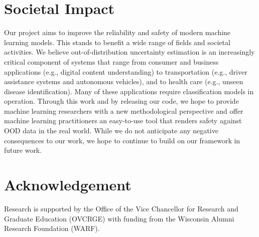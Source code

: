\documentclass{article}
\begin{document}
\vspace{-0.2cm}
\section{Societal Impact}
\label{sec:broad}
\vspace{-0.3cm}
Our project aims to improve the reliability and safety of modern machine learning models.
This stands to benefit a wide range of fields and societal activities. We believe out-of-distribution uncertainty estimation is an increasingly critical component of systems that range from consumer and business applications (e.g., digital content understanding) to transportation (e.g., driver assistance systems and autonomous vehicles), and to health care (e.g., unseen disease identification). Many of these applications require classification models in operation.\@
Through this work and by releasing our code, we hope to provide machine learning researchers with a new methodological perspective and offer machine learning practitioners an easy-to-use tool that renders safety against OOD data in the real world. While we do not anticipate any negative consequences to our work, we hope to continue to build on our framework in future work. 
\vspace{-0.2cm}
\section*{Acknowledgement}
\vspace{-0.3cm}
 Research is supported by the Office of the Vice Chancellor for Research and Graduate Education (OVCRGE) with funding from the Wisconsin Alumni Research Foundation (WARF).


\newpage




\end{document}
